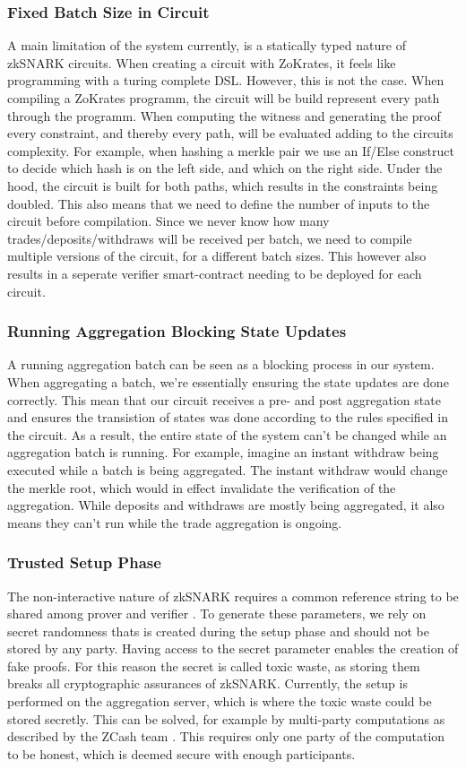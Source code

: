 \documentclass[../../thesis.tex]{subfiles}
\begin{document}
\subsubsection{Fixed Batch Size in Circuit}
A main limitation of the system currently, is a statically typed nature of zkSNARK circuits. When creating a circuit with ZoKrates, it feels like programming with a turing complete DSL. However, this is not the case. When compiling a ZoKrates programm, the circuit will be build represent every path through the programm. When computing the witness and generating the proof every constraint, and thereby every path, will be evaluated adding to the circuits complexity. For example, when hashing a merkle pair we use an If/Else construct to decide which hash is on the left side, and which on the right side. Under the hood, the circuit is built for both paths, which results in the constraints being doubled. This also means that we need to define the number of inputs to the circuit before compilation. Since we never know how many trades/deposits/withdraws will be received per batch, we need to compile multiple versions of the circuit, for a different batch sizes. This however also results in a seperate verifier smart-contract needing to be deployed for each circuit.

\subsubsection{Running Aggregation Blocking State Updates}
A running aggregation batch can be seen as a blocking process in our system. When aggregating a batch, we're essentially ensuring the state updates are done correctly. This mean that our circuit receives a pre- and post aggregation state and ensures the transistion of states was done according to the rules specified in the circuit. As a result, the entire state of the system can't be changed while an aggregation batch is running. For example, imagine an instant withdraw being executed while a batch is being aggregated. The instant withdraw would change the merkle root, which would in effect invalidate the verification of the aggregation. While deposits and withdraws are mostly being aggregated, it also means they can't run while the trade aggregation is ongoing. 

\subsubsection{Trusted Setup Phase}
The non-interactive nature of zkSNARK requires a common reference string to be shared among prover and verifier \cite{zcash_2019}. To generate these parameters, we rely on secret randomness thats is created during the setup phase and should not be stored by any party. Having access to the secret parameter enables the creation of fake proofs. For this reason the secret is called toxic waste, as storing them breaks all cryptographic assurances of zkSNARK. Currently, the setup is performed on the aggregation server, which is where the toxic waste could be stored secretly. This can be solved, for example by multi-party computations as described by the ZCash team \cite{zcash_2019}. This requires only one party of the computation to be honest, which is deemed secure with enough participants.
\end{document}
